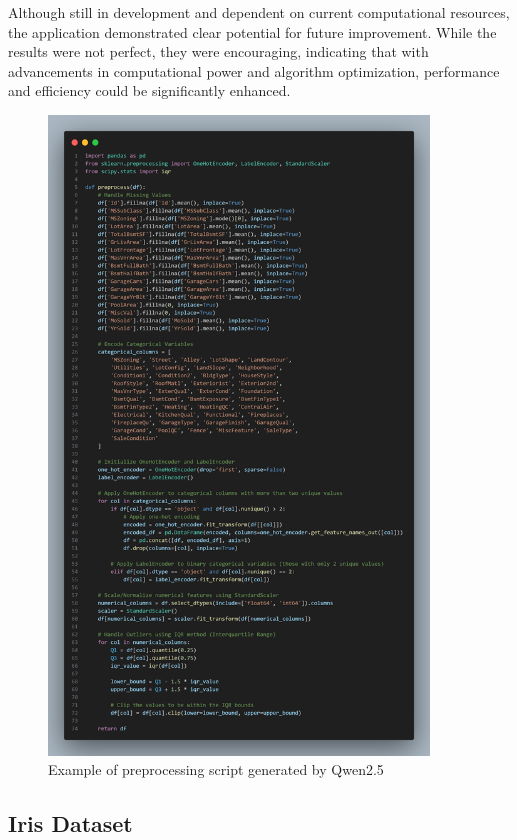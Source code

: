 Although still in development and dependent on current computational resources,
the application demonstrated clear potential for future improvement. While the
results were not perfect, they were encouraging, indicating that with
advancements in computational power and algorithm optimization, performance and
efficiency could be significantly enhanced.

\begin{figure}[H]
    \centering
    \includegraphics[width=0.9\textwidth]{media/Qwen2.5code.png}
    \caption{Example of preprocessing script generated by Qwen2.5}
    \label{fig:application-driven-preprocessing}
\end{figure}

\newpage
\subsection{Iris Dataset}

